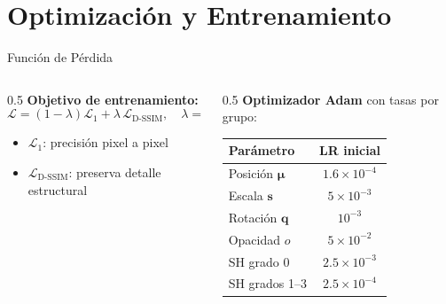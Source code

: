 \section{Optimización y Entrenamiento}

\begin{frame}{Función de Pérdida}
  \begin{columns}
    \begin{column}{0.5\textwidth}
      \textbf{Objetivo de entrenamiento:}
      \[
        \mathcal{L} = (1-\lambda)\mathcal{L}_1 + \lambda\,\mathcal{L}_{\text{D-SSIM}}, \quad \lambda = 0.2
      \]
      \begin{itemize}
        \item $\mathcal{L}_1$: precisión pixel a pixel
        \item $\mathcal{L}_{\text{D-SSIM}}$: preserva detalle estructural
      \end{itemize}
    \end{column}
    \begin{column}{0.5\textwidth}
      \textbf{Optimizador Adam} con tasas por grupo:
      \small
      \begin{tabular}{lc}
        \toprule
        Parámetro & LR inicial \\
        \midrule
        Posición $\boldsymbol{\mu}$ & $1.6\times10^{-4}$ \\
        Escala $\mathbf{s}$ & $5\times10^{-3}$ \\
        Rotación $\mathbf{q}$ & $10^{-3}$ \\
        Opacidad $o$ & $5\times10^{-2}$ \\
        SH grado 0 & $2.5\times10^{-3}$ \\
        SH grados 1--3 & $2.5\times10^{-4}$ \\
        \bottomrule
      \end{tabular}
    \end{column}
  \end{columns}
\end{frame}

